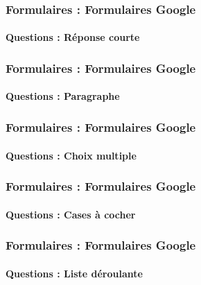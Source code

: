 \documentclass[xcolor=table]{beamer}
\begin{document}
\begin{frame}
\frametitle{Formulaires : Formulaires Google}
\framesubtitle{Questions : Réponse courte}

\begin{center}
	
\end{center}

\end{frame}

\begin{frame}
\frametitle{Formulaires : Formulaires Google}
\framesubtitle{Questions : Paragraphe}

\begin{center}
	
\end{center}

\end{frame}

\begin{frame}
\frametitle{Formulaires : Formulaires Google}
\framesubtitle{Questions : Choix multiple}

\begin{center}
	
\end{center}

\end{frame}

\begin{frame}
\frametitle{Formulaires : Formulaires Google}
\framesubtitle{Questions : Cases à cocher}

\begin{center}
	
\end{center}

\end{frame}

\begin{frame}
\frametitle{Formulaires : Formulaires Google}
\framesubtitle{Questions : Liste déroulante}

\begin{center}
	
\end{center}

\end{frame}
\end{document}
